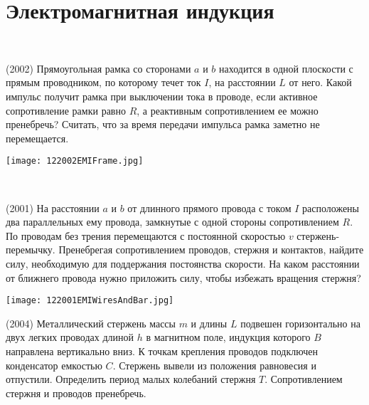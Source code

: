 \section{Электромагнитная индукция}

\begin{ex}
\hspace{0pt} \\
\begin{minipage}{.65\textwidth}
(2002) Прямоугольная рамка со сторонами $a$ и $b$ находится в одной плоскости с прямым проводником, по которому течет ток $I$, на расстоянии $L$ от него. Какой импульс получит рамка при выключении тока в проводе, если активное сопротивление рамки равно $R$, а реактивным сопротивлением ее можно пренебречь? 
Считать, что за время передачи импульса рамка заметно не перемещается.
\end{minipage}
\begin{minipage}{.35\textwidth}
\centering
\texttt{[image: 122002EMIFrame.jpg]}
\end{minipage}
\begin{ans}
\end{ans}
\end{ex}

\begin{ex}
\hspace{0pt} \\
\begin{minipage}{.65\textwidth}
(2001) На расстоянии $a$ и $b$ от длинного прямого провода с током $I$ расположены два параллельных ему провода, 
замкнутые с одной стороны сопротивлением $R$. По проводам без трения перемещаются с постоянной скоростью $v$ стержень-перемычку. 
Пренебрегая сопротивлением проводов, стержня и контактов, найдите силу, необходимую для поддержания постоянства скорости. 
На каком расстоянии от ближнего провода нужно приложить силу, чтобы избежать вращения стержня?
\end{minipage}
\begin{minipage}{.35\textwidth}
\centering
\texttt{[image: 122001EMIWiresAndBar.jpg]}
\end{minipage}
\begin{ans}
\end{ans}
\end{ex}

\begin{ex}
(2004) Металлический стержень массы $m$ и длины $L$ подвешен горизонтально на двух легких проводах длиной $h$ в магнитном поле, 
индукция которого $B$ направлена вертикально вниз. К точкам крепления проводов подключен конденсатор емкостью $C$. 
Стержень вывели из положения равновесия и отпустили. Определить период малых колебаний стержня $T$. Сопротивлением стержня и проводов пренебречь.
\begin{ans}
\end{ans}
\end{ex}

